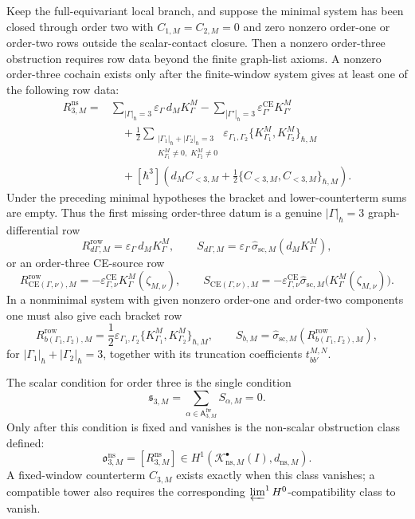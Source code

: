\begin{prop}\label{prop:app-first-order-three-enlarged-row}
  Keep the full-equivariant local branch, and suppose the minimal system has
  been closed through order two with
  \(C_{1,M}=C_{2,M}=0\) and zero nonzero order-one or order-two rows outside
  the scalar-contact closure.  Then a nonzero order-three obstruction
  requires row data beyond the finite graph-list axioms.  A nonzero order-three
  cochain exists only after the finite-window system gives at least one
  of the following row data:
  \[
  \begin{aligned}
    R^{\mathrm{ns}}_{3,M}
      ={}&
      \sum_{|\Gamma|_\hbar=3}
        \varepsilon_\Gamma\,d_M K^M_\Gamma
      -\sum_{|\Gamma'|_\hbar=3}
        \varepsilon^{\mathrm{CE}}_{\Gamma'}K^M_{\Gamma'}\\
      &\quad
      +\frac12
      \sum_{\substack{|\Gamma_1|_\hbar+|\Gamma_2|_\hbar=3\\
        K^M_{\Gamma_1}\neq0,\;K^M_{\Gamma_2}\neq0}}
        \varepsilon_{\Gamma_1,\Gamma_2}
        \{K^M_{\Gamma_1},K^M_{\Gamma_2}\}_{\hbar,M}\\
      &\quad
      +[\hbar^3]\left(
        d_M C_{<3,M}
        +\frac12\{C_{<3,M},C_{<3,M}\}_{\hbar,M}\right).
  \end{aligned}
  \]
  Under the preceding minimal hypotheses the bracket and lower-counterterm
  sums are empty.  Thus the first missing order-three datum is a genuine
  \(|\Gamma|_\hbar=3\) graph-differential row
  \[
    R^{\mathrm{row}}_{d\Gamma,M}
      =
    \varepsilon_\Gamma\,d_M K^M_\Gamma,
    \qquad
    S_{d\Gamma,M}
      =
    \varepsilon_\Gamma\,\widehat\sigma_{\mathrm{sc},M}(d_M K^M_\Gamma),
  \]
  or an order-three CE-source row
  \[
    R^{\mathrm{row}}_{\mathrm{CE}(\Gamma,\nu),M}
      =
    -\varepsilon^{\mathrm{CE}}_{\Gamma,\nu}
      K^M_\Gamma(\zeta_{M,\nu}),
    \qquad
    S_{\mathrm{CE}(\Gamma,\nu),M}
      =
    -\varepsilon^{\mathrm{CE}}_{\Gamma,\nu}
      \widehat\sigma_{\mathrm{sc},M}
      \bigl(K^M_\Gamma(\zeta_{M,\nu})\bigr).
  \]
  In a nonminimal system with given nonzero order-one and order-two
  components one must also give each bracket row
  \[
    R^{\mathrm{row}}_{b(\Gamma_1,\Gamma_2),M}
      =
    \frac12\varepsilon_{\Gamma_1,\Gamma_2}
    \{K^M_{\Gamma_1},K^M_{\Gamma_2}\}_{\hbar,M},
    \qquad
    S_{b,M}
      =
    \widehat\sigma_{\mathrm{sc},M}
      (R^{\mathrm{row}}_{b(\Gamma_1,\Gamma_2),M}),
  \]
  for \(|\Gamma_1|_\hbar+|\Gamma_2|_\hbar=3\), together with its
  truncation coefficients \(t^{M,N}_{bb'}\).

  The scalar condition for order three is the single condition
  \[
    \mathfrak s_{3,M}
      =
    \sum_{\alpha\in\mathsf A^{\mathrm{fw}}_{3,M}}S_{\alpha,M}=0.
  \]
  Only after this condition is fixed and vanishes is the non-scalar obstruction
  class defined:
  \[
    \mathfrak o^{\mathrm{ns}}_{3,M}
      =
    [R^{\mathrm{ns}}_{3,M}]
    \in H^1\!\left(
      \mathcal K^\bullet_{\mathrm{ns},M}(I),d_{\mathrm{ns},M}
    \right).
  \]
  A fixed-window counterterm \(C_{3,M}\) exists exactly when this class
  vanishes; a compatible tower also requires the corresponding
  \(\varprojlim^1 H^0\)-compatibility class to vanish.
\end{prop}

